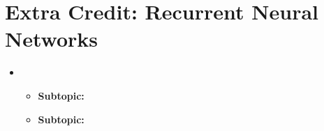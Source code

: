 
\section{Extra Credit: Recurrent Neural Networks}
\medskip
\begin{itemize}

    \item {}

    \begin{itemize}
    \item \textbf{Subtopic:} 
    \item \textbf{Subtopic:} 
    \end{itemize}

\end{itemize}


